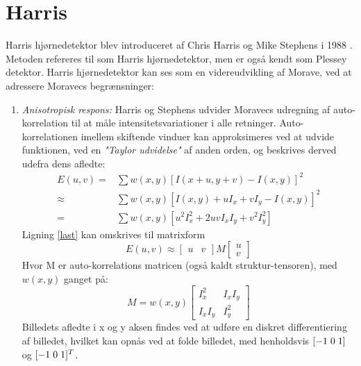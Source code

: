 \section{Harris}\label{sec:harris}
Harris hjørnedetektor blev introduceret af Chris Harris og Mike Stephens i 1988 \cite{harris}. Metoden refereres til som Harris hjørnedetektor, men er også kendt som Plessey detektor. Harris hjørnedetektor kan ses som en videreudvikling af Morave, ved at adressere Moravecs begrænsninger:
\begin{enumerate}
\item{ \textit{Anisotropisk respons:} Harris og Stephens udvider Moravecs udregning af auto-korrelation til at måle intensitetsvariationer i alle retninger. Auto-korrelationen imellem skiftende vinduer kan approksimeres ved at udvide funktionen, ved en \textit{"Taylor udvidelse"} af anden orden, og beskrives derved udefra dens afledte:
\begin{subequations}
\begin{align}
E(u,v) = & \sum w(x,y)[I(x + u, y + v) - I(x,y)]^2 \\
\approx & \sum w(x,y)[I(x,y) + uI_x  + vI_y - I(x,y)]^2 \\
= & \sum w(x,y)[u^2I_x^2 + 2uvI_xI_y + v^2I_y^2]  \label{last}
\end{align}
\end{subequations}
Ligning \eqref{last} kan omskrives til matrixform
\begin{equation}
E(u,v) \approx
\begin{bmatrix}
        u & v
     \end{bmatrix}
M
\begin{bmatrix}
        u \\
        v
     \end{bmatrix}
\end{equation} 
Hvor M er auto-korrelations matricen (også kaldt struktur-tensoren), med $w(x,y)$ ganget på:
\begin{equation}
M = w(x,y) 
\begin{bmatrix}
	I_x^2 & I_xI_y \\
	I_xI_y & I_y^2
\end{bmatrix}
\label{structens}
\end{equation}
Billedets afledte i x og y aksen findes ved at udføre en diskret differentiering af billedet, hvilket kan opnås
 ved at folde billedet, med henholdsvis $[-1 \hspace{0.1cm} 0 \hspace{0.1cm} 1]$ og $[-1 \hspace{0.1cm} 0 \hspace{0.1cm} 1]^T$. }

\end{enumerate}
